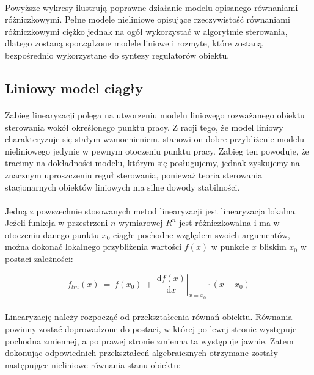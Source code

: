 \documentclass[a4paper,12pt]{article}
\begin{document}
\paragraph{}
Powyższe wykresy ilustrują poprawne działanie modelu opisanego równaniami różniczkowymi.
Pełne modele nieliniowe opisujące rzeczywistość równaniami różniczkowymi ciężko jednak na ogół wykorzystać w algorytmie sterowania, dlatego zostaną sporządzone modele liniowe i rozmyte, które zostaną bezpośrednio wykorzystane do syntezy regulatorów obiektu.

\subsection{Liniowy model ciągły}
\paragraph{}
Zabieg linearyzacji polega na utworzeniu modelu liniowego rozważanego obiektu sterowania wokół określonego punktu pracy.
Z racji tego, że model liniowy charakteryzuje się stałym wzmocnieniem, stanowi on dobre przybliżenie modelu nieliniowego jedynie w pewnym otoczeniu punktu pracy.
Zabieg ten powoduje, że tracimy na dokładności modelu, którym się posługujemy, jednak zyskujemy na znacznym uproszczeniu reguł sterowania, ponieważ teoria sterowania stacjonarnych obiektów liniowych ma silne dowody stabilności.

\paragraph{}
Jedną z powszechnie stosowanych metod linearyzacji jest linearyzacja lokalna.
Jeżeli funkcja w przestrzeni $n$ wymiarowej $R^n$ jest różniczkowalna i ma w otoczeniu danego punktu $x_0$ ciągłe pochodne względem swoich argumentów, można dokonać lokalnego przybliżenia wartości $f(x)$ w punkcie $x$ bliskim $x_0$ w postaci zależności:

\begin{equation}
   f_{lin}(x) ~=~ f(x_0) ~+~ \left.\frac{\text{d}f(x)}{\text{d}x}\right|_{x=x_0} \cdot (x - x_0)
\end{equation}

\paragraph{}
Linearyzację należy rozpocząć od przekształcenia równań obiektu.
Równania powinny zostać doprowadzone do postaci, w której po lewej stronie występuje pochodna zmiennej, a po prawej stronie zmienna ta występuje jawnie.
Zatem dokonując odpowiednich przekształceń algebraicznych otrzymane zostały następujące nieliniowe równania stanu obiektu:
\end{document}
